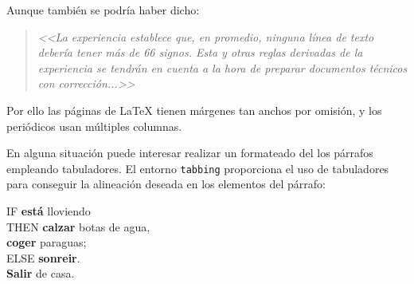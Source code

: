 \documentclass[11pt,a4paper,draft]{article}
\begin{document}
Aunque también se podría haber dicho: 
\begin{quote}
\emph{	<<La experiencia establece que, en promedio, ninguna línea de texto debería tener más de 66 signos. Esta y otras reglas derivadas de la experiencia se tendrán en cuenta a la hora de preparar documentos técnicos con corrección...>>}
\end{quote}


Por ello las páginas de \LaTeX{} tienen márgenes tan anchos por omisión, y los periódicos usan múltiples columnas. 

En alguna situación puede interesar realizar un formateado del los párrafos empleando tabuladores. El entorno \texttt{tabbing} proporciona el uso de tabuladores para conseguir la alineación deseada en los elementos del párrafo:





\begin{tabbing}
IF	\= \textbf{está} lloviendo                \\
 	\> THEN \= \textbf{calzar} botas de agua, \\
 	\>      \> \textbf{coger} paraguas;       \\
 	\> ELSE \> \textbf{sonreir}.              \\
\textbf{Salir} de casa.
\end{tabbing}
\end{document}
